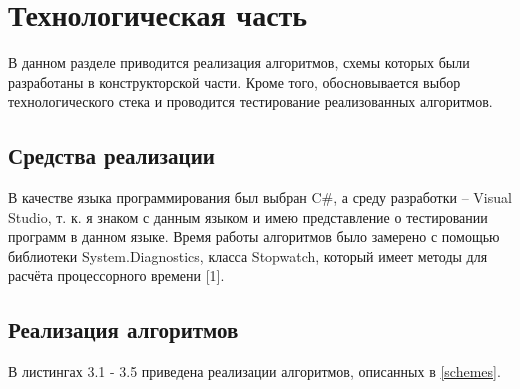 \documentclass{report}
\begin{document}
\chapter{Технологическая часть}
В данном разделе приводится реализация алгоритмов, схемы которых были разработаны в конструкторской части. Кроме того, обосновывается выбор технологического стека и проводится тестирование реализованных алгоритмов.
\section{Средства реализации}

В качестве языка программирования был выбран C\#, а среду разработки -- Visual Studio, т. к. я знаком с данным языком и имею представление о тестировании программ в данном языке. Время работы алгоритмов было замерено с помощью библиотеки System.Diagnostics, класса Stopwatch, который имеет методы для расчёта процессорного времени [1].

\section{Реализация алгоритмов}

В листингах 3.1 - 3.5 приведена реализации алгоритмов, описанных в \ref{schemes}.
\end{document}
